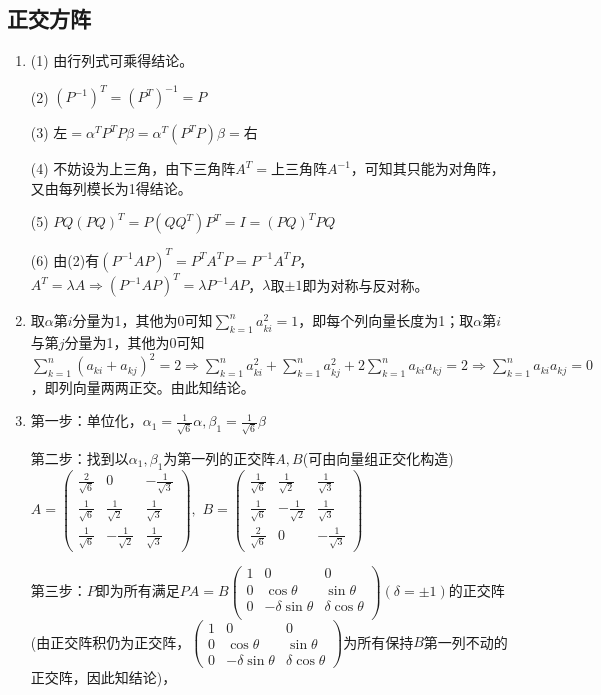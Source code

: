 \documentclass[a4paper,UTF8,fontset=windows]{ctexart}
\begin{document}
\subsection{正交方阵}
\begin{enumerate}
\item
(1) 由行列式可乘得结论。

(2) $(P^{-1})^T=(P^T)^{-1}=P$

(3) 左$=\alpha^TP^TP\beta=\alpha^T(P^TP)\beta=$右

(4) 不妨设为上三角，由下三角阵$A^T=$上三角阵$A^{-1}$，可知其只能为对角阵，又由每列模长为1得结论。 

(5) $PQ(PQ)^T=P(QQ^T)P^T=I=(PQ)^TPQ$

(6) 由(2)有$(P^{-1}AP)^T=P^TA^TP=P^{-1}A^TP$，$A^T=\lambda A\Rightarrow(P^{-1}AP)^T=\lambda P^{-1}AP$，$\lambda$取$\pm1$即为对称与反对称。

\item
取$\alpha$第$i$分量为1，其他为0可知$\sum_{k=1}^{n}a_{ki}^2=1$，即每个列向量长度为1；取$\alpha$第$i$与第$j$分量为1，其他为0可知$\sum_{k=1}^{n}\left(a_{ki}+a_{kj}\right)^2=2\Rightarrow\sum_{k=1}^{n}a_{ki}^2+\sum_{k=1}^{n}a_{kj}^2+2\sum_{k=1}^{n}a_{ki}a_{kj}=2\Rightarrow\sum_{k=1}^{n}a_{ki}a_{kj}=0$，即列向量两两正交。由此知结论。

\item
第一步：单位化，$\alpha_1=\frac{1}{\sqrt6}\alpha,\beta_1=\frac{1}{\sqrt6}\beta$

第二步：找到以$\alpha_1,\beta_1$为第一列的正交阵$A,B$(可由向量组正交化构造)
$A=\begin{pmatrix}\frac{2}{\sqrt6}&0&-\frac{1}{\sqrt3}\\[1.5ex]\frac{1}{\sqrt6}&\frac{1}{\sqrt2}&\frac{1}{\sqrt3}\\[1.5ex]\frac{1}{\sqrt6}&-\frac{1}{\sqrt2}&\frac{1}{\sqrt3}\end{pmatrix},$
$B=\begin{pmatrix}\frac{1}{\sqrt6}&\frac{1}{\sqrt2}&\frac{1}{\sqrt3}\\[1.5ex]\frac{1}{\sqrt6}&-\frac{1}{\sqrt2}&\frac{1}{\sqrt3}\\[1.5ex]\frac{2}{\sqrt6}&0&-\frac{1}{\sqrt3}\end{pmatrix}$

第三步：$P$即为所有满足$PA=B\begin{pmatrix}1&0&0\\0&\cos\theta&\sin\theta\\0&-\delta\sin\theta&\delta\cos\theta\\\end{pmatrix}(\delta=\pm1)$的正交阵(由正交阵积仍为正交阵，$\begin{pmatrix}1&0&0\\0&\cos\theta&\sin\theta\\0&-\delta\sin\theta&\delta\cos\theta\end{pmatrix}$为所有保持$B$第一列不动的正交阵，因此知结论)，


\end{enumerate}
\end{document}
